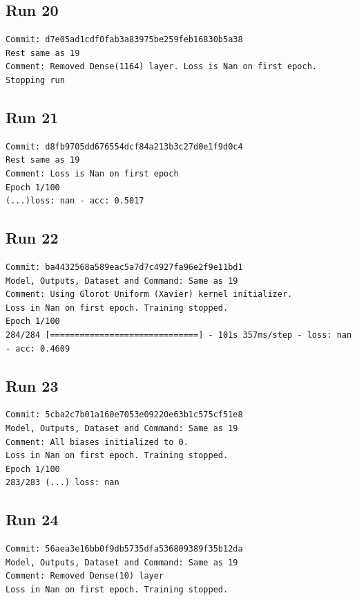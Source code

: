\subsection{Run 20}

\begin{verbatim}
Commit: d7e05ad1cdf0fab3a83975be259feb16830b5a38
Rest same as 19
Comment: Removed Dense(1164) layer. Loss is Nan on first epoch.
Stopping run

\end{verbatim}

\subsection{Run 21}
\begin{verbatim}
Commit: d8fb9705dd676554dcf84a213b3c27d0e1f9d0c4 
Rest same as 19
Comment: Loss is Nan on first epoch
Epoch 1/100
(...)loss: nan - acc: 0.5017
\end{verbatim}

\subsection{Run 22}
\begin{verbatim}
Commit: ba4432568a589eac5a7d7c4927fa96e2f9e11bd1
Model, Outputs, Dataset and Command: Same as 19
Comment: Using Glorot Uniform (Xavier) kernel initializer.
Loss in Nan on first epoch. Training stopped.
Epoch 1/100
284/284 [==============================] - 101s 357ms/step - loss: nan - acc: 0.4609
\end{verbatim}

\subsection{Run 23}
\begin{verbatim}
Commit: 5cba2c7b01a160e7053e09220e63b1c575cf51e8  
Model, Outputs, Dataset and Command: Same as 19
Comment: All biases initialized to 0.
Loss in Nan on first epoch. Training stopped.
Epoch 1/100
283/283 (...) loss: nan 
\end{verbatim}

\subsection{Run 24}
\begin{verbatim}
Commit: 56aea3e16bb0f9db5735dfa536809389f35b12da  
Model, Outputs, Dataset and Command: Same as 19
Comment: Removed Dense(10) layer
Loss in Nan on first epoch. Training stopped.
\end{verbatim}

